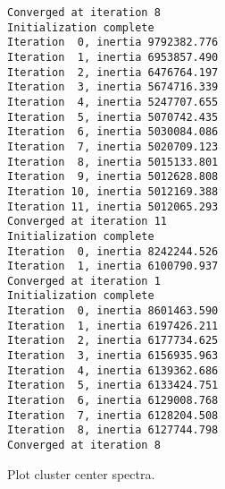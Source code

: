 \documentclass{article}
\begin{document}
\begin{Verbatim}[commandchars=\\\{\}]
Converged at iteration 8
Initialization complete
Iteration  0, inertia 9792382.776
Iteration  1, inertia 6953857.490
Iteration  2, inertia 6476764.197
Iteration  3, inertia 5674716.339
Iteration  4, inertia 5247707.655
Iteration  5, inertia 5070742.435
Iteration  6, inertia 5030084.086
Iteration  7, inertia 5020709.123
Iteration  8, inertia 5015133.801
Iteration  9, inertia 5012628.808
Iteration 10, inertia 5012169.388
Iteration 11, inertia 5012065.293
Converged at iteration 11
Initialization complete
Iteration  0, inertia 8242244.526
Iteration  1, inertia 6100790.937
Converged at iteration 1
Initialization complete
Iteration  0, inertia 8601463.590
Iteration  1, inertia 6197426.211
Iteration  2, inertia 6177734.625
Iteration  3, inertia 6156935.963
Iteration  4, inertia 6139362.686
Iteration  5, inertia 6133424.751
Iteration  6, inertia 6129008.768
Iteration  7, inertia 6128204.508
Iteration  8, inertia 6127744.798
Converged at iteration 8
    \end{Verbatim}

    Plot cluster center spectra.
\end{document}
